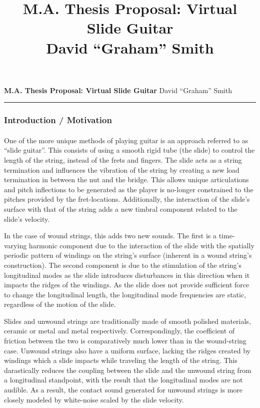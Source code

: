 \documentclass[12pt]{article}
\title{M.A. Thesis Proposal: Virtual Slide Guitar \\David ``Graham'' Smith}
\begin{document}

\begin{flushleft}
    \large \textbf{M.A. Thesis Proposal: Virtual Slide Guitar}
    \hfill
    \normalsize David ``Graham'' Smith
\end{flushleft}
\hrule

\subsubsection*{Introduction / Motivation}
\paragraph{}
One of the more unique methods of playing guitar is an approach referred to as “slide guitar”. This consists of using a smooth rigid tube (the slide) to control the length of the string, instead of the frets and fingers. The slide acts as a string termination and influences the vibration of the string by creating a new load termination in between the nut and the bridge. This allows unique articulations and pitch inflections to be generated as the player is no-longer constrained to the pitches provided by the fret-locations. Additionally, the interaction of the slide’s surface with that of the string adds a new timbral component related to the slide’s velocity. 

In the case of wound strings, this adds two new sounds. The first is a time-varying harmonic component due to the interaction of the slide with the spatially periodic pattern of windings on the string’s surface (inherent in a wound string’s construction).  The second component is due to the stimulation of the string’s longitudinal modes as the slide introduces disturbances in this direction when it impacts the ridges of the windings. As the slide does not provide sufficient force to change the longitudinal length, the longitudinal mode frequencies are static, regardless of the motion of the slide. 

Slides and unwound strings are traditionally made of smooth polished materials, ceramic or metal and metal respectively. Correspondingly, the coefficient of friction between the two is comparatively much lower than in the wound-string case. Unwound strings also have a uniform surface, lacking the ridges created by windings which a slide impacts while traveling the length of the string. This darastically reduces the coupling between the slide and the unwound string from a longitudinal standpoint, with the result that the longitudinal modes are not audible. As a result, the contact sound generated for unwound strings is more closely modeled by white-noise scaled by the slide velocity. 
\end{document}
